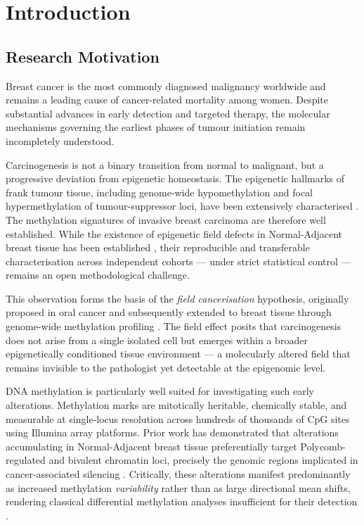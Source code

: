 \chapter{Introduction}
\label{chap:introduction}


\section{Research Motivation  }

Breast cancer is the most commonly diagnosed malignancy worldwide
and remains a leading cause of cancer-related mortality among women.
Despite substantial advances in early detection and targeted therapy,
the molecular mechanisms governing the earliest phases of tumour
initiation remain incompletely understood.

Carcinogenesis is not a binary transition from normal to malignant,
but a progressive deviation from epigenetic homeostasis.
The epigenetic hallmarks of frank tumour tissue, including
genome-wide hypomethylation and focal hypermethylation of
tumour-suppressor loci, have been extensively characterised
\cite{ehrlich2002,bird2002}. The methylation signatures of
invasive breast carcinoma are therefore well established.
While the existence of epigenetic field defects in Normal-Adjacent
breast tissue has been established \cite{Teschendorff2016},
their reproducible and transferable characterisation across
independent cohorts — under strict statistical control —
remains an open methodological challenge.

This observation forms the basis of the \textit{field cancerisation}
hypothesis, originally proposed in oral cancer and subsequently
extended to breast tissue through genome-wide methylation profiling
\cite{Teschendorff2016}. The field effect posits that carcinogenesis
does not arise from a single isolated cell but emerges within a
broader epigenetically conditioned tissue environment —
a molecularly altered field that remains invisible to the pathologist
yet detectable at the epigenomic level.

DNA methylation is particularly well suited for investigating
such early alterations. Methylation marks are mitotically heritable,
chemically stable, and measurable at single-locus resolution
across hundreds of thousands of CpG sites using Illumina array
platforms. Prior work has demonstrated that alterations
accumulating in Normal-Adjacent breast tissue preferentially
target Polycomb-regulated and bivalent chromatin loci,
precisely the genomic regions implicated in cancer-associated
silencing \cite{Teschendorff2016,Teschendorff2010}.
Critically, these alterations manifest predominantly as
increased methylation \emph{variability} rather than as large
directional mean shifts, rendering classical differential
methylation analyses insufficient for their detection
\cite{Teschendorff2014}.

